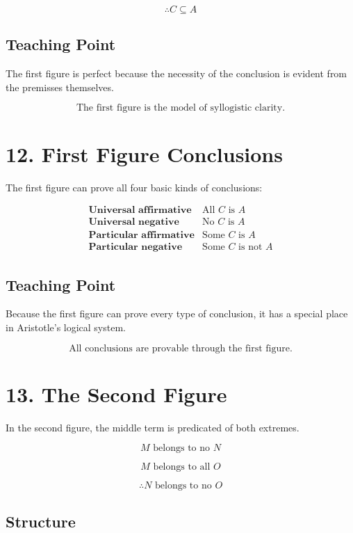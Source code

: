 \documentclass[12pt]{article}
\begin{document}
\[
\therefore C \subseteq A
\]

\subsection*{Teaching Point}

The first figure is perfect because the necessity of the conclusion is evident
from the premisses themselves.

\[
\boxed{
\text{The first figure is the model of syllogistic clarity.}
}
\]

\section*{12. First Figure Conclusions}

The first figure can prove all four basic kinds of conclusions:

\[
\begin{array}{ll}
\textbf{Universal affirmative} & \text{All } C \text{ is } A \\
\textbf{Universal negative} & \text{No } C \text{ is } A \\
\textbf{Particular affirmative} & \text{Some } C \text{ is } A \\
\textbf{Particular negative} & \text{Some } C \text{ is not } A
\end{array}
\]

\subsection*{Teaching Point}

Because the first figure can prove every type of conclusion, it has a special
place in Aristotle's logical system.

\[
\boxed{
\text{All conclusions are provable through the first figure.}
}
\]

\section*{13. The Second Figure}

In the second figure, the middle term is predicated of both extremes.

\[
M \text{ belongs to no } N
\]

\[
M \text{ belongs to all } O
\]

\[
\therefore N \text{ belongs to no } O
\]

\subsection*{Structure}
\end{document}

